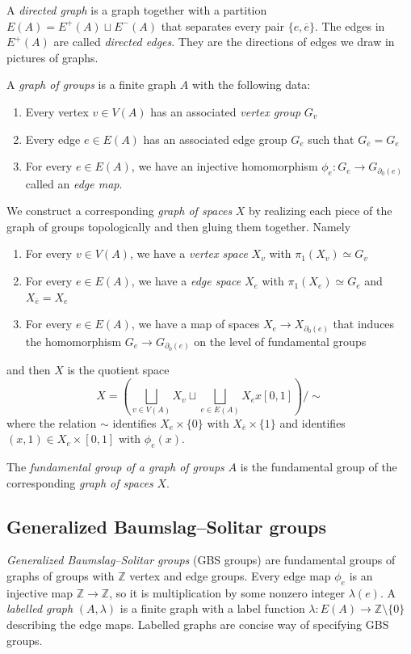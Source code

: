\documentclass[10pt]{article}
\def\integers{{\mathbb{Z}}}
\theoremstyle{definition}
\begin{document}
A \textit{directed graph} is a graph together with a partition $E(A) = E^+(A) \sqcup E^-(A)$ that separates every pair $\{e,\overline{e}\}$. The edges in $E^+(A)$ are called \textit{directed edges}. They are the directions of edges we draw in pictures of graphs. 

A \textit{graph of groups} is a finite graph $A$ with the following data:
\begin{enumerate}
    \item Every vertex $v\in V(A)$ has an associated \textit{vertex group} $G_v$
    \item Every edge $e\in E(A)$ has an associated edge group $G_e$ such that $G_{\overline{e}}=G_e$
    \item For every $e\in E(A)$, we have an injective homomorphism $\phi_e: G_e \to G_{\partial_0(e)}$ called an \textit{edge map}.
\end{enumerate}

We construct a corresponding \textit{graph of spaces} $X$  by realizing each piece of the graph of groups topologically and then gluing them together. Namely
\begin{enumerate}
    \item For every $v\in V(A)$, we have a \textit{vertex space} $X_v$ with $\pi_1(X_v)\simeq G_v$
    \item For every $e\in E(A)$, we have a \textit{edge space} $X_e$ with $\pi_1(X_e)\simeq G_e$ and $X_{\overline{e}}=X_e$
    \item For every $e\in E(A)$, we have a map of spaces $X_e \to X_{\partial_0(e)}$ that induces the  homomorphism $G_e \to G_{\partial_0(e)}$ on the level of fundamental groups
\end{enumerate}
and then $X$ is the quotient space $$X = \left(\bigsqcup_{v\in V(A)} X_v \sqcup \bigsqcup_{e\in E(A)} X_e x [0,1] \right)/\sim$$ where the relation $\sim$ identifies $X_e \times \{0\}$ with $X_{\overline{e}} \times \{1\}$ and identifies $(x,1)\in X_e \times [0,1]$ with $\phi_e(x)$. 

The \textit{fundamental group of a graph of groups} $A$ is the fundamental group of the corresponding \textit{graph of spaces} $X$. 

\subsection{Generalized Baumslag--Solitar groups}
\textit{Generalized Baumslag--Solitar groups} (GBS groups) are fundamental groups of  graphs of groups with $\integers$ vertex and edge groups. Every edge map $\phi_e$ is an injective map $\integers\to \integers$, so it is multiplication by some nonzero integer $\lambda(e)$. 
A \textit{labelled graph} $(A,\lambda)$ is a finite graph with a label function $\lambda:E(A) \to \integers \setminus \{0\}$ describing the edge maps.  Labelled graphs are concise way of specifying GBS groups. 
\end{document}
